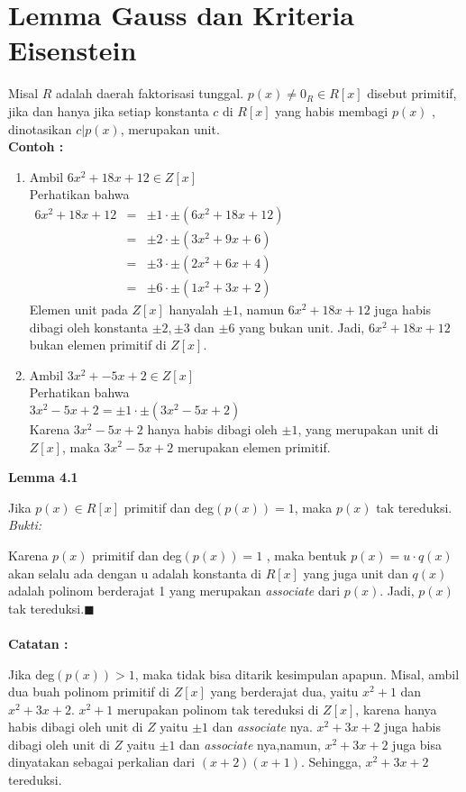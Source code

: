 

\chapter{Lemma Gauss dan Kriteria Eisenstein}
\par 	Misal $R$ adalah daerah faktorisasi tunggal. $p(x) \ne 0_R \in R[x]$ disebut primitif, jika dan hanya jika setiap konstanta $c$ di $R[x]$ yang habis membagi $p(x)$ , dinotasikan $c|p(x)$, merupakan unit.
	\\
	\textbf{ Contoh :}
	 \begin{enumerate}
	\item Ambil $6x^2 + 18x+12 \in Z[x]$
	\\
	Perhatikan bahwa\\
	$\begin{array} {rcl}
	6x^2 + 18x+12 &=& \pm 1 \cdot \pm(6x^2 + 18x+12)\\
	&=& \pm 2 \cdot \pm(3x^2 + 9x+6)\\
	&=& \pm 3 \cdot \pm(2x^2 + 6x+4)\\
	&=& \pm 6 \cdot \pm(1x^2 + 3x+2)
	\end{array}$\\
	Elemen unit pada  $Z[x]$ hanyalah $\pm1$, namun $6x^2 + 18x+12$ juga habis dibagi oleh konstanta $\pm 2, \pm 3$ dan $ \pm 6$ yang bukan unit. Jadi,  $6x^2 + 18x+12$ bukan elemen primitif di $Z[x]$.
	\item Ambil $3x^2 + -5x+2 \in Z[x]$
	\\
	Perhatikan bahwa
	\\
	$3x^2 - 5x+ 2 = \pm 1 \cdot \pm(3x^2 - 5x+2)$\\
	Karena $3x^2  -5x+2 $ hanya habis dibagi oleh $\pm1$, yang merupakan unit di $Z[x]$, maka $3x^2  -5x+2 $ merupakan elemen primitif.
	\end{enumerate}
	\textbf{ Lemma 4.1}
\par 	Jika $p(x) \in R[x]$ primitif dan deg$(p(x))=1$, maka $p(x)$ tak tereduksi. 
	\\
	\textit{Bukti:}
\par 	Karena $p(x)$ primitif dan deg$(p(x)) =1$ , maka bentuk $p(x)=u \cdot q(x)$ akan selalu ada dengan u adalah konstanta di $R[x]$ yang juga unit dan $q(x)$ adalah polinom berderajat 1 yang merupakan \textit{associate} dari $p(x)$. Jadi, $p(x)$ tak tereduksi.$\blacksquare$
	\\
	\\
	\textbf{Catatan :}
\par 	Jika deg$(p(x)) > 1$, maka tidak bisa ditarik kesimpulan apapun. Misal, ambil dua buah polinom primitif di $Z[x]$ yang berderajat dua, yaitu $x^2 + 1$ dan $x^2 + 3x +2$.  $x^2 + 1$ merupakan polinom tak tereduksi di $Z[x]$, karena hanya habis dibagi oleh 		unit di $Z$ yaitu $\pm1$ dan \textit{associate} nya.  $x^2 + 3x +2$ juga habis dibagi oleh unit di $Z$ yaitu $\pm1$ dan \textit{associate} nya,namun, $x^2 + 3x +2$ juga bisa dinyatakan sebagai perkalian dari $(x+2)(x+1)$. Sehingga, $x^2 + 3x +2$ 			tereduksi.
